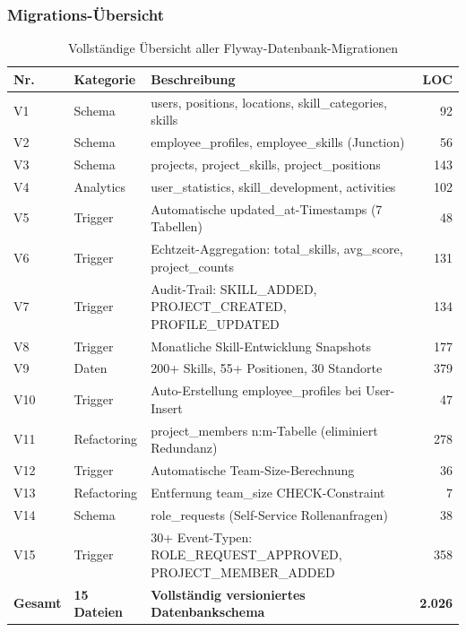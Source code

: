 \subsubsection{Migrations-Übersicht}

\begin{table}[H]
\centering
\footnotesize
{}
\begin{tabularx}{\textwidth}{|l|l|X|r|}
\hline
\rowcolor{EDAGDunkelgrau!10}
\textbf{Nr.} & \textbf{Kategorie} & \textbf{Beschreibung} & \textbf{LOC} \\
\hline
V1 & Schema & users, positions, locations, skill\_categories, skills & 92 \\
\hline
V2 & Schema & employee\_profiles, employee\_skills (Junction) & 56 \\
\hline
V3 & Schema & projects, project\_skills, project\_positions & 143 \\
\hline
V4 & Analytics & user\_statistics, skill\_development, activities & 102 \\
\hline
V5 & Trigger & Automatische updated\_at-Timestamps (7 Tabellen) & 48 \\
\hline
V6 & Trigger & Echtzeit-Aggregation: total\_skills, avg\_score, project\_counts & 131 \\
\hline
V7 & Trigger & Audit-Trail: SKILL\_ADDED, PROJECT\_CREATED, PROFILE\_UPDATED & 134 \\
\hline
V8 & Trigger & Monatliche Skill-Entwicklung Snapshots & 177 \\
\hline
V9 & Daten & 200+ Skills, 55+ Positionen, 30 Standorte & 379 \\
\hline
V10 & Trigger & Auto-Erstellung employee\_profiles bei User-Insert & 47 \\
\hline
V11 & Refactoring & project\_members n:m-Tabelle (eliminiert Redundanz) & 278 \\
\hline
V12 & Trigger & Automatische Team-Size-Berechnung & 36 \\
\hline
V13 & Refactoring & Entfernung team\_size CHECK-Constraint & 7 \\
\hline
V14 & Schema & role\_requests (Self-Service Rollenanfragen) & 38 \\
\hline
V15 & Trigger & 30+ Event-Typen: ROLE\_REQUEST\_APPROVED, PROJECT\_MEMBER\_ADDED & 358 \\
\hline
\rowcolor{EDAGDunkelgrau!30}
\textbf{Gesamt} & \textbf{15 Dateien} & \textbf{Vollständig versioniertes Datenbankschema} & \textbf{2.026} \\
\hline
\end{tabularx}
\caption{Vollständige Übersicht aller Flyway-Datenbank-Migrationen}
\label{tab:db_migrations}
\end{table}

